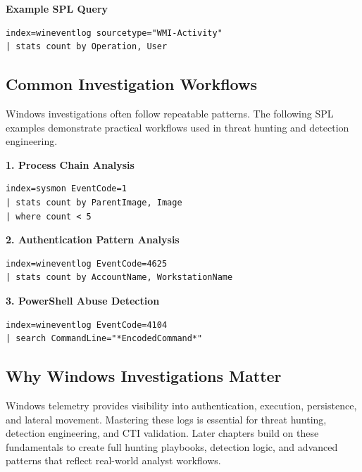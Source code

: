 \textbf{Example SPL Query}

\begin{lstlisting}
index=wineventlog sourcetype="WMI-Activity"
| stats count by Operation, User
\end{lstlisting}


\subsection*{Common Investigation Workflows}

Windows investigations often follow repeatable patterns. 
The following SPL examples demonstrate practical workflows used in threat hunting and detection engineering.

\textbf{1. Process Chain Analysis}

\begin{lstlisting}
index=sysmon EventCode=1
| stats count by ParentImage, Image
| where count < 5
\end{lstlisting}

\textbf{2. Authentication Pattern Analysis}

\begin{lstlisting}
index=wineventlog EventCode=4625
| stats count by AccountName, WorkstationName
\end{lstlisting}

\textbf{3. PowerShell Abuse Detection}

\begin{lstlisting}
index=wineventlog EventCode=4104
| search CommandLine="*EncodedCommand*"
\end{lstlisting}


\subsection*{Why Windows Investigations Matter}

Windows telemetry provides visibility into authentication, execution, persistence, and lateral movement. 
Mastering these logs is essential for threat hunting, detection engineering, and CTI validation. 
Later chapters build on these fundamentals to create full hunting playbooks, detection logic, and advanced patterns 
that reflect real-world analyst workflows.
